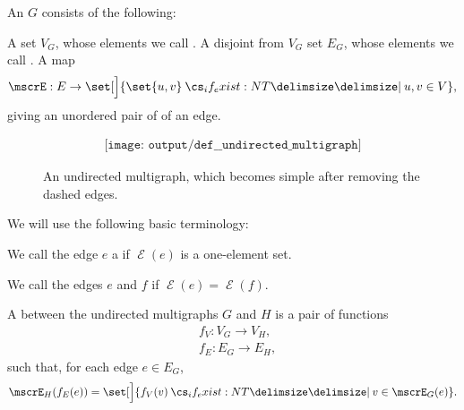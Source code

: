 \begin{definition}\label{def:undirected_multigraph}
  An  \( G \) consists of the following:
  \begin{thmenum}[series=def:undirected_multigraph]
     A set \( V_G \), whose elements we call .
     A disjoint from \( V_G \) set \( E_G \), whose elements we call .
     A map
    \begin{equation*}
      \mscrE: E \to \set[\Big]{ \set{ u, v } \given* u, v \in V },
    \end{equation*}
    giving an unordered pair of  of an edge.
  \end{thmenum}

  \begin{figure}[!ht]
    \begin{equation}\label{eq:fig:def:undirected_multigraph}
      \begin{aligned}
        \texttt{[image: output/def\_\_undirected\_multigraph]}
      \end{aligned}
    \end{equation}
    \caption{An undirected multigraph, which becomes simple after removing the dashed edges.}\label{fig:def:undirected_multigraph}
  \end{figure}

  We will use the following basic terminology:
  \begin{thmenum}[resume=def:undirected_multigraph]
     We call the edge \( e \) a  if \( \mscrE(e) \) is a one-element set.

    \medskip

     We call the edges \( e \) and \( f \)  if \( \mscrE(e) = \mscrE(f) \).

     A  between the undirected multigraphs \( G \) and \( H \) is a pair of functions
    \begin{align*}
      &f_V: V_G \to V_H, \\
      &f_E: E_G \to E_H,
    \end{align*}
    such that, for each edge \( e \in E_G \),
    \begin{equation}\label{eq:def:undirected_multigraph/homomorphism}
      \mscrE_H(f_E(e)) = \set[\Big]{ f_V(v) \given* v \in \mscrE_G(e) }.
    \end{equation}


\end{thmenum}
\end{definition}
